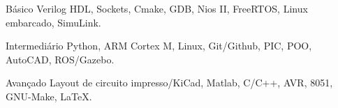 

\begin{cvskills}

  \cvskill
    {Básico} %
    {Verilog HDL, Sockets, Cmake, GDB, Nios II, FreeRTOS, Linux embarcado, SimuLink.} %

  \cvskill
    {Intermediário} %
    {Python, ARM Cortex M, Linux, Git/Github, PIC, POO, AutoCAD, ROS/Gazebo.} %

  \cvskill
    {Avançado} %
    {Layout de circuito impresso/KiCad, Matlab, C/C++, AVR, 8051, GNU-Make, LaTeX.} %

\end{cvskills}




